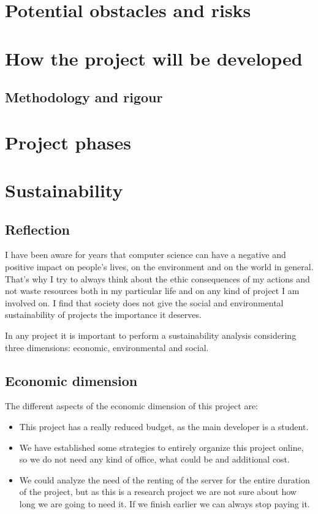 \documentclass{article}
\begin{document}
\section{Potential obstacles and risks}
\section{How the project will be developed}
\subsection{Methodology and rigour}
\section{Project phases}


\section{Sustainability}
\subsection{Reflection}
I have been aware for years that computer science can have a negative and positive impact on people's lives, on the environment and on the world in general. That's why I try to always think about the ethic consequences of my actions and not waste resources both in my particular life and on any kind of project I am involved on. I find that society does not give the social and environmental sustainability of projects the importance it deserves. 

In any project it is important to perform a sustainability analysis considering three dimensions: economic, environmental and social. 

\subsection{Economic dimension}
The different aspects of the economic dimension of this project are:
\begin{itemize}
    \item This project has a really reduced budget, as the main developer is a student. 
    \item We have established some strategies to entirely organize this project online, so we do not need any kind of office, what could be and additional cost.
    \item We could analyze the need of the renting of the server for the entire duration of the project, but as this is a research project we are not sure about how long we are going to need it. If we finish earlier we can always stop paying it.
    
\end{itemize}
\end{document}
